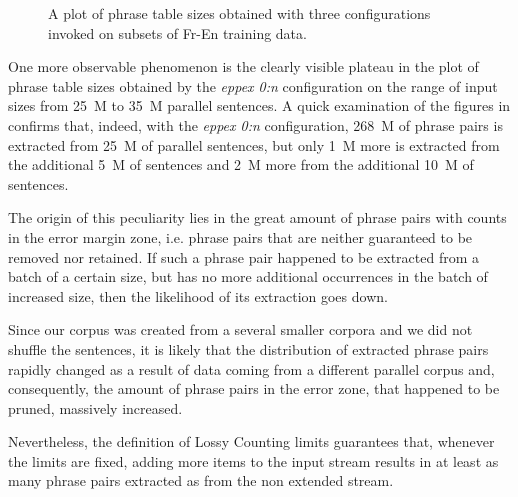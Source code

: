 \begin{figure}[!htb]
  \centering
  
  \caption{
    A plot of phrase table sizes obtained with three \eppex{} configurations invoked on subsets of Fr-En training data.
  }
  \label{fig:fr-en-phrase-table-sizes}
\end{figure}

One more observable phenomenon is the clearly visible plateau in the plot of phrase table sizes
obtained by the \emph{eppex 0:n} configuration on the range of input sizes from 25~M to 35~M parallel sentences.
A quick examination of the figures in  confirms that, indeed, with
the \emph{eppex 0:n} configuration, 268~M of phrase pairs is extracted from 25~M of parallel sentences,
but only 1~M more is extracted from the additional 5~M of sentences and 2~M more from the additional
10~M of sentences.

The origin of this peculiarity lies in the great amount of phrase pairs with counts in the error
margin zone, i.e. phrase pairs that are neither guaranteed to be removed nor retained.
If such a phrase pair happened to be extracted from a batch of a certain size, but has no more
additional occurrences in the batch of increased size, then the likelihood of its extraction
goes down.

Since our corpus was created from a several smaller corpora and we did not shuffle the sentences,
it is likely that the distribution of extracted phrase pairs rapidly changed as a result of data
coming from a different parallel corpus and, consequently, the amount of phrase pairs in the error zone,
that happened to be pruned, massively increased.

Nevertheless, the definition of Lossy Counting limits guarantees that,
whenever the limits are fixed, adding more items to the input stream results in at least
as many phrase pairs extracted as from the non extended stream.
